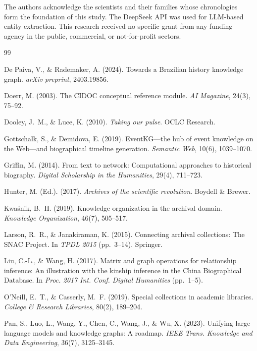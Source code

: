 \documentclass[review]{elsarticle}
\begin{document}
The authors acknowledge the scientists and their families whose chronologies form the foundation of this study. The DeepSeek API was used for LLM-based entity extraction. This research received no specific grant from any funding agency in the public, commercial, or not-for-profit sectors.

\begin{thebibliography}{99}

De Paiva, V., \& Rademaker, A. (2024). Towards a Brazilian history knowledge graph. \emph{arXiv preprint}, 2403.19856.

Doerr, M. (2003). The CIDOC conceptual reference module. \emph{AI Magazine}, 24(3), 75--92.

Dooley, J.~M., \& Luce, K. (2010). \emph{Taking our pulse}. OCLC Research.

Gottschalk, S., \& Demidova, E. (2019). EventKG---the hub of event knowledge on the Web---and biographical timeline generation. \emph{Semantic Web}, 10(6), 1039--1070.

Griffin, M. (2014). From text to network: Computational approaches to historical biography. \emph{Digital Scholarship in the Humanities}, 29(4), 711--723.

Hunter, M. (Ed.). (2017). \emph{Archives of the scientific revolution}. Boydell \& Brewer.

Kwa\'{s}nik, B.~H. (2019). Knowledge organization in the archival domain. \emph{Knowledge Organization}, 46(7), 505--517.

Larson, R.~R., \& Janakiraman, K. (2015). Connecting archival collections: The SNAC Project. In \emph{TPDL 2015} (pp.~3--14). Springer.

Liu, C.-L., \& Wang, H. (2017). Matrix and graph operations for relationship inference: An illustration with the kinship inference in the China Biographical Database. In \emph{Proc. 2017 Int. Conf. Digital Humanities} (pp.~1--5).

O'Neill, E.~T., \& Casserly, M.~F. (2019). Special collections in academic libraries. \emph{College \& Research Libraries}, 80(2), 189--204.

Pan, S., Luo, L., Wang, Y., Chen, C., Wang, J., \& Wu, X. (2023). Unifying large language models and knowledge graphs: A roadmap. \emph{IEEE Trans. Knowledge and Data Engineering}, 36(7), 3125--3145.


\end{thebibliography}
\end{document}
